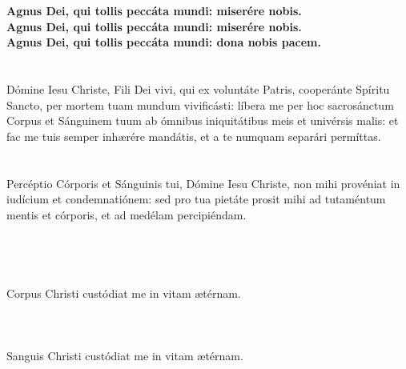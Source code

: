 \documentclass[12pt, a4paper]{article}
\begin{document}
	\\
	\\
	\textbf{Agnus Dei, qui tollis peccáta
		mundi: miserére nobis.}
	\\
	\textbf{Agnus Dei, qui tollis peccáta
		mundi: miserére nobis.}
	\\
	\textbf{Agnus Dei, qui tollis peccáta
		mundi: dona nobis pacem.}
	\\\\
	\\
	Dómine Iesu Christe, Fili Dei vivi,
	qui ex voluntáte Patris, cooperánte
	Spíritu Sancto, per mortem tuam
	mundum vivificásti: líbera me per
	hoc sacrosánctum Corpus et
	Sánguinem tuum ab ómnibus
	iniquitátibus meis et univérsis
	malis: et fac me tuis semper
	inhærére mandátis, et a te
	numquam separári permíttas.
	\\\\
	\\
	Percéptio Córporis et Sánguinis tui,
	Dómine Iesu Christe, non mihi
	provéniat in iudícium et
	condemnatiónem: sed pro tua
	pietáte prosit mihi ad tutaméntum
	mentis et córporis, et ad medélam
	percipiéndam.
	\\\\
	\\
	\\
	\\
	Corpus Christi custódiat me in
	vitam ætérnam.
	\\\\
	\\
	\\
	Sanguis Christi custódiat me in
	vitam ætérnam.
	\\\\
	\\
\end{document}
